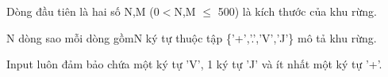 Dòng đầu tiên là hai số N,M (0$<$N,M  $\le$ 500) là kích thước của khu rừng.  

   N dòng sao mỗi dòng gồmN ký tự thuộc tập \{'+','.','V','J'\} mô tả khu rừng.  

   Input luôn đảm bảo chứa một ký tự 'V', 1 ký tự 'J' và ít nhất một ký tự '+'.